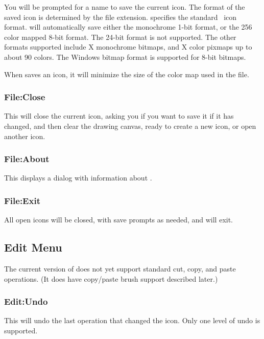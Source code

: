 You will be prompted for a name to save the current icon.
The format of the saved icon is determined by the file
extension.  specifies the standard \V\ icon
format.  will automatically save either
the monochrome 1-bit  format, or the 256
color mapped 8-bit  format. The 24-bit
 format is not supported. The other formats
supported include X  monochrome bitmaps, and
X  color pixmaps up to about 90 colors.
The Windows  bitmap format is supported
for 8-bit bitmaps.

When  saves an icon, it will minimize
the size of the color map used in the file.

\subsubsection*{File:Close}

This will close the current icon, asking you if
you want to save it if it has changed, and then clear
the drawing canvas, ready to create a new icon, or
open another icon.

\subsubsection*{File:About}

This displays a dialog with information about .

\subsubsection*{File:Exit}

All open icons will be closed, with save prompts as needed,
and  will exit.

\subsection {Edit Menu}

The current version of  does not yet support
standard cut, copy, and paste operations. (It does have
copy/paste brush support described later.)

\subsubsection* {Edit:Undo}

This will undo the last operation that changed the icon.
Only one level of undo is supported.

